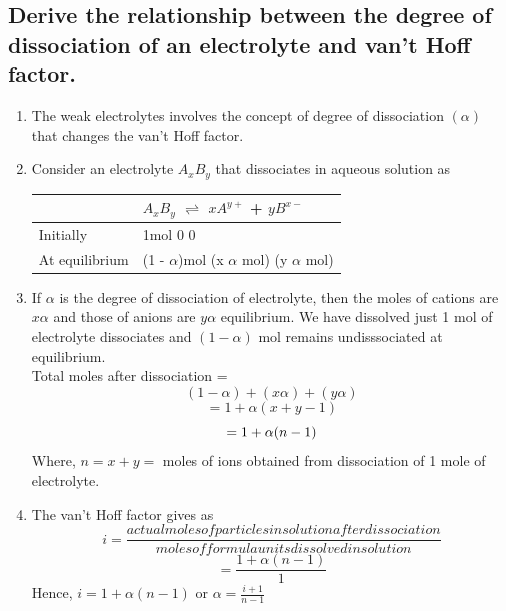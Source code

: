\documentclass{article}
\begin{document}
   \subsection{Derive the relationship between the degree of
   dissociation of an electrolyte and van't Hoff factor.}
   \begin{enumerate}
	\item The weak electrolytes involves the concept of degree 
	of dissociation $(\alpha)$ that changes the van't Hoff factor.
	\item Consider an electrolyte $A_xB_y$ that dissociates in
	aqueous solution as 
	\begin{center}
	\begin{tabular}{ | m{20em} | m{20em} | }
	\hline
	\vspace{4em} &  $A_xB_y$ $\rightleftharpoons$ $xA^{y+}$ + 
	$yB^{x-}$ \\
	\hline
	Initially & 1mol \hspace{0.7cm} 0 \hspace{0.7cm} 0 \\
	\hline
	At equilibrium & (1 - $\alpha$)mol \hspace{0.7cm} 
	(x $\alpha$ mol)
	\hspace{0.7cm} (y $\alpha$ mol) \\
	\hline
	\end{tabular}
	\end{center}
	\item If $\alpha$ is the degree of dissociation of electrolyte,
	then the moles of cations are $x\alpha$ and those of anions 
	are $y\alpha$ equilibrium. We have dissolved just 1 mol of 
	electrolyte dissociates and $(1 - \alpha)$ mol remains 
	undisssociated at equilibrium.\\
	Total moles after dissociation = 
	\begin{equation}
		(1 - \alpha) + (x\alpha) + (y\alpha)
	\end{equation}
	\begin{equation}
		= 1 + \alpha(x + y -1)
	\end{equation}
	\begin{equation}
		= 1 + \alpha(n-1) \\
	\end{equation}
	Where, $n = x + y =$ moles of ions obtained from dissociation
	of 1 mole of electrolyte.
	\item The van't Hoff factor gives as
	\begin{equation}
		i = \frac{actual moles of particles insolution after
		dissociation}{moles of formula units dissolved in
		solution}
	\end{equation}
	\begin{equation}
		= \frac{1 + \alpha(n-1)}{1}
	\end{equation}
	Hence, $i = 1 + \alpha(n-1)$ or $\alpha = \frac{i + 1} {n - 1}$
   \end{enumerate}
\end{document}

